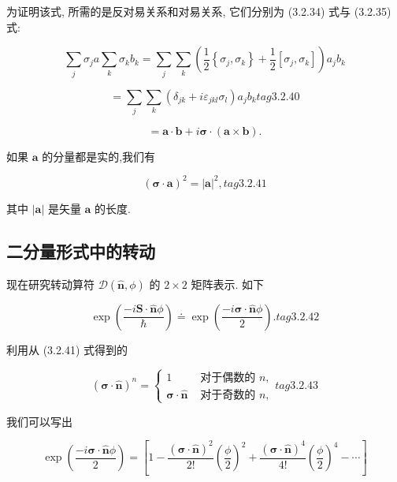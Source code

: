 为证明该式, 所需的是反对易关系和对易关系, 它们分别为 (3.2.34) 式与 (3.2.35) 式:

$$
\mathop{\sum }\limits_{j}{\sigma }_{j}a\mathop{\sum }\limits_{k}{\sigma }_{k}{b}_{k} = \mathop{\sum }\limits_{j}\mathop{\sum }\limits_{k}\left( {\frac{1}{2}\left\{ {{\sigma }_{j},{\sigma }_{k}}\right\} + \frac{1}{2}\left\lbrack {{\sigma }_{j},{\sigma }_{k}}\right\rbrack }\right) {a}_{j}{b}_{k}
$$

$$
= \mathop{\sum }\limits_{j}\mathop{\sum }\limits_{k}\left( {{\delta }_{jk} + i{\varepsilon }_{jkl}{\sigma }_{l}}\right) {a}_{j}{b}_{k} tag{3. 2.40}
$$

$$
= \mathbf{a} \cdot \mathbf{b} + i\mathbf{\sigma } \cdot \left( {\mathbf{a} \times \mathbf{b}}\right) .
$$

如果 $\mathbf{a}$ 的分量都是实的,我们有

$$
{\left( \mathbf{\sigma } \cdot \mathbf{a}\right) }^{2} = {\left| \mathbf{a}\right| }^{2}, tag{3. 2.41}
$$

其中 $\left| \mathbf{a}\right|$ 是矢量 $\mathbf{a}$ 的长度.

\subsection{二分量形式中的转动}

现在研究转动算符 $\mathcal{D}\left( {\widehat{\mathbf{n}},\phi }\right)$ 的 $2 \times 2$ 矩阵表示. 如下

$$
\exp \left( \frac{-i\mathbf{S} \cdot \widehat{\mathbf{n}}\phi }{\hslash }\right) \doteq \exp \left( \frac{-i\mathbf{\sigma } \cdot \widehat{\mathbf{n}}\phi }{2}\right) . tag{3. 2.42}
$$

利用从 (3.2.41) 式得到的

$$
{\left( \mathbf{\sigma } \cdot \widehat{\mathbf{n}}\right) }^{n} = \left\{ \begin{array}{ll} 1 & \text{ 对于偶数的 }n, \\ \mathbf{\sigma } \cdot \widehat{\mathbf{n}} & \text{ 对于奇数的 }n, \end{array}\right. tag{3.2.43}
$$

我们可以写出

$$
\exp \left( \frac{-i\mathbf{\sigma } \cdot \widehat{\mathbf{n}}\phi }{2}\right) = \left\lbrack {1 - \frac{{\left( \mathbf{\sigma } \cdot \widehat{\mathbf{n}}\right) }^{2}}{2!}{\left( \frac{\phi }{2}\right) }^{2} + \frac{{\left( \mathbf{\sigma } \cdot \widehat{\mathbf{n}}\right) }^{4}}{4!}{\left( \frac{\phi }{2}\right) }^{4} - \cdots }\right\rbrack
$$

